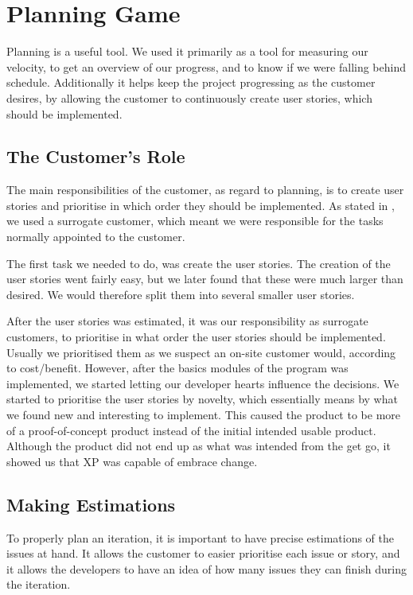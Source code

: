 \section{Planning Game}
Planning is a useful tool.
We used it primarily as a tool for measuring our velocity, to get an overview of our progress, and to know if we were falling behind schedule.
Additionally it helps keep the project progressing as the customer desires, by allowing the customer to continuously create user stories, which should be implemented.

\subsection{The Customer's Role}
The main responsibilities of the customer, as regard to planning, is to create user stories and prioritise in which order they should be implemented.
As stated in , we used a surrogate customer, which meant we were responsible for the tasks normally appointed to the customer.

The first task we needed to do, was create the user stories.
The creation of the user stories went fairly easy, but we later found that these were much larger than desired.
We would therefore split them into several smaller user stories.

After the user stories was estimated, it was our responsibility as surrogate customers, to prioritise in what order the user stories should be implemented.
Usually we prioritised them as we suspect an on-site customer would, according to cost/benefit.
However, after the basics modules of the program was implemented, we started letting our developer hearts influence the decisions.
We started to prioritise the user stories by novelty, which essentially means by what we found new and interesting to implement.
This caused the product to be more of a proof-of-concept product instead of the initial intended usable product.
Although the product did not end up as what was intended from the get go, it showed us that XP was capable of embrace change.


\subsection{Making Estimations}
To properly plan an iteration, it is important to have precise estimations of the issues at hand.
It allows the customer to easier prioritise each issue or story, and it allows the developers to have an idea of how many issues they can finish during the iteration.

